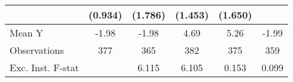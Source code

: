 {\begin{tabular}{l*{5}{c}}
            &     (0.934)         &     (1.786)         &     (1.453)         &     (1.650)         &                     \\
\midrule
Mean Y      &       -1.98         &       -1.98         &        4.69         &        5.26         &       -1.99         \\
Observations&         377         &         365         &         382         &         375         &         359         \\
Exc. Inst. F-stat&                     &       6.115         &       6.105         &       0.153         &       0.099         \\
\bottomrule
\end{tabular}
}
